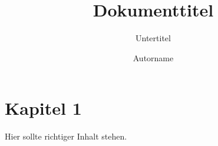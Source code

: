 \documentclass[11pt, a4paper, bigheadings, twoside,
 titlepage, halfparskip, tocleft, cleardoubleempty,
 noonelinecaption, origlongtable, german]{scrartcl}
\title[Kurzform]{Dokumenttitel} %
\subtitle{Untertitel} %
\author{Autorname} %
\begin{document}
 \maketitle

 \tableofcontents
 \cleardoublepage

 \section{Kapitel 1}

 Hier sollte richtiger Inhalt stehen.
\end{document}
